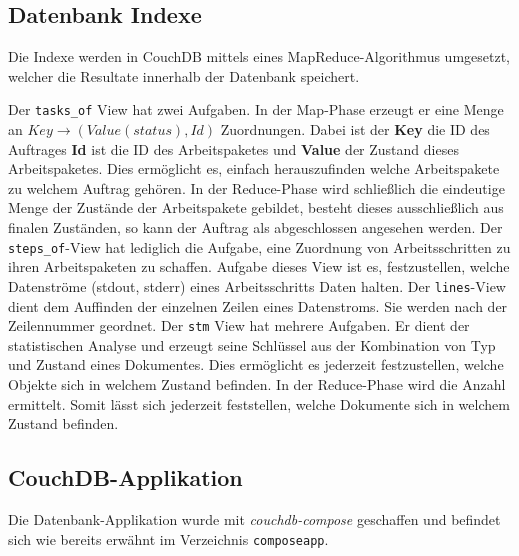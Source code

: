 \subsection{Datenbank Indexe}
\label{sec:db-indexe}

Die Indexe werden in CouchDB mittels 
eines MapReduce-Algorithmus \cite{couchdb:views} umgesetzt,
welcher die Resultate innerhalb der Datenbank speichert.

\begin{description}
    \dhitem[tasks\_of]
        Der \verb|tasks_of| View hat zwei Aufgaben.
        In der Map-Phase erzeugt er eine Menge an \hbox{$Key \rightarrow (Value(status), Id)$} Zuordnungen.
        Dabei ist der \textbf{Key} die ID des Auftrages
        \textbf{Id} ist die ID des Arbeitspaketes
        und \textbf{Value} der Zustand dieses Arbeitspaketes.
        Dies ermöglicht es, einfach herauszufinden
        welche Arbeitspakete zu welchem Auftrag gehören.
        In der Reduce-Phase wird schließlich die eindeutige Menge
        der Zustände der Arbeitspakete gebildet,
        besteht dieses ausschließlich aus finalen Zuständen,
        so kann der Auftrag als abgeschlossen angesehen werden.
    \dhitem[steps\_of]
        Der \verb|steps_of|-View hat lediglich die Aufgabe,
        eine Zuordnung von Arbeitsschritten
        zu ihren Arbeitspaketen zu schaffen.
    \dhitem[streams]
        Aufgabe dieses View ist es,
        festzustellen, welche Datenströme (stdout, stderr)
        eines Arbeitsschritts Daten halten.
    \dhitem[lines]
        Der \verb|lines|-View dient dem Auffinden der einzelnen Zeilen
        eines Datenstroms. Sie werden nach der Zeilennummer geordnet.
    \dhitem[stm]
        Der \verb|stm| View hat mehrere Aufgaben.
        Er dient der statistischen Analyse und
        erzeugt seine Schlüssel aus der Kombination
        von Typ und Zustand eines Dokumentes.
        Dies ermöglicht es jederzeit festzustellen,
        welche Objekte sich in welchem Zustand befinden.
        In der Reduce-Phase wird die Anzahl ermittelt.
        Somit lässt sich jederzeit feststellen,
        welche Dokumente sich in welchem Zustand befinden.
\end{description}

\subsection{CouchDB-Applikation}

Die Datenbank-Applikation wurde mit \emph{couchdb-compose} \cite{couchdb:compose} geschaffen und befindet sich wie bereits erwähnt im Verzeichnis \verb|composeapp|.

